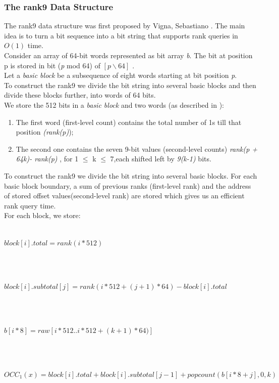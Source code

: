 \documentclass[11pt,a4paper]{report}
\begin{document}

\subsubsection{The rank9 Data Structure} \label{The rank9 Data Structure}


The rank9 data structure was first proposed by Vigna, Sebastiano \cite{rank9}.
The main idea is to turn a bit sequence into a bit string that supports
rank queries in $O(1)$ time.\\

Consider an array of 64-bit words represented as bit array \emph{b}.
The bit at position p is stored in bit (\emph{p} mod 64) of
$ [p \backslash 64]$ \cite{rank9}.\\ 
Let a \emph{basic block} be a subsequence of eight words 
starting at bit position \emph{p}.\\
To construct the rank9  we divide the bit string into several basic
blocks and then divide these blocks further, into words of 64 bits.\\
We store the 512 bits in a \emph{basic block} and two words (as described in \cite{rank9}):

\begin{enumerate}

	\item The first word (first-level count) contains the total number of
	 1s till that position \emph{(rank(p)});
	
	\item The second one contains the seven 9-bit values (second-level counts)
	 \emph{rank(p + 64k)- rank(p)} , for 1 $\leq$ k $\leq$ 7,each shifted left by \emph{9(k-1)} bits.
	
\end{enumerate}

To construct the rank9  we divide the bit string into several basic blocks.
For each basic block boundary, a sum of previous ranks (first-level rank) and the address of  
stored offset values(second-level rank) are stored which gives us an efficient rank query time. \\

For each block, we store:\\\\
\centerline{$ block[i].total= rank(i*512)$}\\\\
\centerline{$ block[i].subtotal[j]= rank(i*512 + (j+1)*64)-block[i].total$}\\\\
\centerline{$ b[i*8]=raw[i*512..i*512+(k+1)*64)] $}\\\\
\centerline{$ OCC_{1}(x)=block[i].total+block[i].subtotal[j-1]+popcount(b[i*8 + j],0,k)$}
\end{document}
